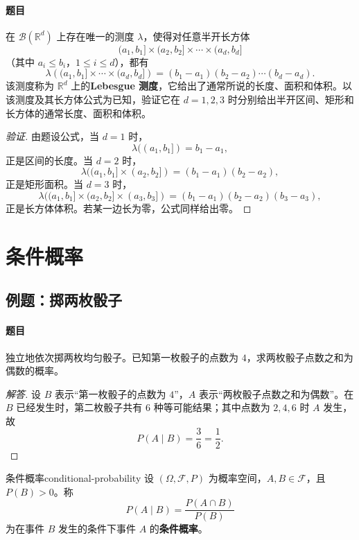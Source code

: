 \paragraph{题目}
在 $\mathscr{B}(\mathbb{R}^d)$ 上存在唯一的测度 $\lambda$，使得对任意半开长方体
\[
(a_1,b_1]\times(a_2,b_2]\times\cdots\times(a_d,b_d]
\]
（其中 $a_i\leq b_i$，$1\leq i\leq d$），都有
\[
\lambda\left((a_1,b_1]\times\cdots\times(a_d,b_d]\right)
=(b_1-a_1)(b_2-a_2)\cdots(b_d-a_d).
\]
该测度称为 $\mathbb{R}^d$ 上的\textbf{Lebesgue 测度}，它给出了通常所说的长度、面积和体积。以该测度及其长方体公式为已知，验证它在 $d=1,2,3$ 时分别给出半开区间、矩形和长方体的通常长度、面积和体积。

\begin{proof}[验证]
由题设公式，当 $d=1$ 时，
\[\lambda((a_1,b_1])=b_1-a_1,\]
正是区间的长度。当 $d=2$ 时，
\[\lambda((a_1,b_1]\times(a_2,b_2])=(b_1-a_1)(b_2-a_2),\]
正是矩形面积。当 $d=3$ 时，
\[\lambda((a_1,b_1]\times(a_2,b_2]\times(a_3,b_3])=(b_1-a_1)(b_2-a_2)(b_3-a_3),\]
正是长方体体积。若某一边长为零，公式同样给出零。
\end{proof}

\clearpage\section{条件概率}\label{k:conditional}

\subsection{例题：掷两枚骰子}\label{note:c1:e14}
\paragraph{题目}
独立地依次掷两枚均匀骰子。已知第一枚骰子的点数为 $4$，求两枚骰子点数之和为偶数的概率。

\begin{proof}[解答]
设 $B$ 表示“第一枚骰子的点数为 $4$”，$A$ 表示“两枚骰子点数之和为偶数”。在 $B$ 已经发生时，第二枚骰子共有 $6$ 种等可能结果；其中点数为 $2,4,6$ 时 $A$ 发生，故
\[
P(A\mid B)=\frac{3}{6}=\frac12.
\]
\end{proof}

\begin{mydefinition}{条件概率}{conditional-probability}
设 $(\Omega,\mathscr{F},P)$ 为概率空间，$A,B\in\mathscr{F}$，且 $P(B)>0$。称
\[
P(A\mid B)=\frac{P(A\cap B)}{P(B)}
\]
为在事件 $B$ 发生的条件下事件 $A$ 的\textbf{条件概率}。
\end{mydefinition}

